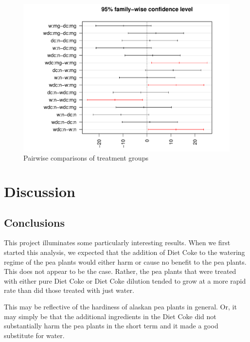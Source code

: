 \documentclass[1p,12pt]{elsarticle}\usepackage[]{graphicx}\usepackage[]{color}
\makeatletter
\def\maxwidth{ %
  \ifdim\Gin@nat@width>\linewidth
    \linewidth
  \else
    \Gin@nat@width
  \fi
}
\newenvironment{knitrout}{}{} %
\makeatother
\begin{document}
\begin{knitrout}
\color{fgcolor}\begin{figure}

{\centering \includegraphics[width=\maxwidth]{figure/pairwise-1} 

}

\caption[Pairwise comparisons of treatment groups]{Pairwise comparisons of treatment groups}\label{fig:pairwise}
\end{figure}


\end{knitrout}


\section{Discussion}

\subsection{Conclusions}
This project illuminates some particularly interesting results. When we first started this analysis, we expected that the addition of Diet Coke to the watering regime of the pea plants would either harm or cause no benefit to the pea plants. This does not appear to be the case. Rather, the pea plants that were treated with either pure Diet Coke or Diet Coke dilution tended to grow at a more rapid rate than did those treated with just water. 

This may be reflective of the hardiness of alaskan pea plants in general. Or, it may simply be that the additional ingredients in the Diet Coke did not substantially harm the pea plants in the short term and it made a good substitute for water.
\end{document}
